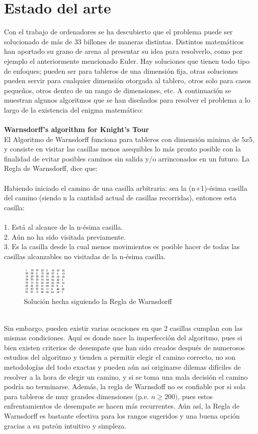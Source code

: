 \documentclass[journal, 10pt]{IEEEtran}
\begin{document}
\section{Estado del arte}
Con el trabajo de ordenadores se ha descubierto que el problema puede ser solucionado de más de 33 billones de maneras distintas. Distintos matemáticos han aportado su grano de arena al presentar su idea para resolverlo, como por ejemplo el anteriormente mencionado Euler. Hay soluciones que tienen todo tipo de enfoques; pueden ser para tableros de una dimensión fija, otras soluciones pueden servir para cualquier dimensión otorgada al tablero, otros solo para casos pequeños, otros dentro de un rango de dimensiones, etc. A continuación se muestran algunos algoritmos que se han diseñados para resolver el problema a lo largo de la existencia del enigma matemático:\\
\\\textbf{Warnsdorff’s algorithm for Knight’s Tour}\\
El Algoritmo de Warnsdorff funciona para tableros con dimensión minima de $5x5$, y consiste en visitar las casillas menos asequibles lo más pronto posible con la finalidad de evitar posibles caminos sin salida y/o arrinconados en un futuro. La Regla de Warnsdorff\cite{Squirrel:1996}, dice que:\\
\\Habiendo iniciado el camino de una casilla arbitraria: sea la (n+1)-ésima casilla del camino (siendo n la cantidad actual de casillas recorridas), entonces esta casilla:\\
\\1. Está al alcance de la n-ésima casilla.\\
2. Aún no ha sido visitada previamente.\\
3. Es la casilla desde la cual menos movimientos es posible hacer de todas las casillas alcanzables no visitadas de la n-ésima casilla.\\
\begin{figure}[h]
\centering
\includegraphics[width=0.2\textwidth]{figures/warnsdorff.png}
\caption{Soluci\'on hecha siguiendo la Regla de Warnsdorff}
\label{fig:euler}
\end{figure}
\\Sin embargo, pueden existir varias ocaciones en que 2 casillas cumplan con las mismas condiciones. Aquí es donde nace la imperfección del algoritmo, pues si bien existen criterios de desempate que han sido creados después de numerosos estudios del algoritmo y tienden a permitir elegir el camino correcto, no son metodologías del todo exactas y pueden aún asi originarse dilemas difíciles de resolver a la hora de elegir un camino, y si se toma una mala decisión el camino podría no terminarse. Además, la regla de Warnsdoff no es confiable por si sola para tableros de muy grandes dimensiones (p.e. $n \geq 200)$, pues estos enfrentamientos de desempate se hacen más recurrentes. Aún así, la Regla de Warnsdorff es bastante efectiva para los rangos sugeridos y una buena opción gracias a su patrón intuitivo y simpleza.   
\end{document}
